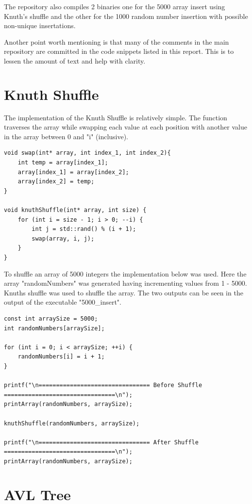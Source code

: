 \documentclass[12pt, a4paper]{report}
\begin{document}
The repository also compiles 2 binaries one for the 5000 array insert using Knuth's shuffle and the other for the 1000 random number insertion with possible non-unique insertations.

Another point worth mentioning is that many of the comments in the main repository are committed in the code snippets listed in this report. This is to lessen the amount of text and help with clarity.

\chapter{Knuth Shuffle}
The implementation of the Knuth Shuffle is relatively simple. The function traverses the array while swapping each value at each position with another value in the array between 0 and "i" (inclusive).
\begin{verbatim}
void swap(int* array, int index_1, int index_2){
    int temp = array[index_1];
    array[index_1] = array[index_2];
    array[index_2] = temp;
}

void knuthShuffle(int* array, int size) {
    for (int i = size - 1; i > 0; --i) {
        int j = std::rand() % (i + 1);
        swap(array, i, j);        
    }
}
\end{verbatim}
To shuffle an array of 5000 integers the implementation below was used. Here the array "randomNumbers" was generated having incrementing values from 1 - 5000. Knuths shuffle was used to shuffle the array. The two outputs can be seen in the output of the executable
"5000\_insert".

\begin{verbatim}
const int arraySize = 5000;
int randomNumbers[arraySize];

for (int i = 0; i < arraySize; ++i) {
    randomNumbers[i] = i + 1;
}

printf("\n================================ Before Shuffle ================================\n");
printArray(randomNumbers, arraySize);

knuthShuffle(randomNumbers, arraySize);

printf("\n================================ After Shuffle ================================\n");
printArray(randomNumbers, arraySize);
\end{verbatim}

\chapter{AVL Tree}
\end{document}
